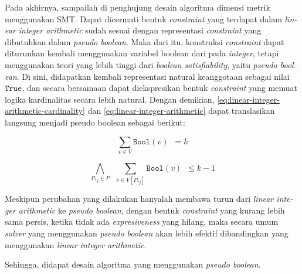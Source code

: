 \documentclass[10pt,twocolumn]{article}
\newcommand{\foreign}[1]{\foreignlanguage{english}{\textit{#1}}}
\def\True{\mathtt{True}}
\def\boolmap{\mathtt{Bool}}
\begin{document}
Pada akhirnya, sampailah di penghujung desain algoritma dimensi metrik menggunakan SMT. Dapat dicermati bentuk \foreign{constraint} yang terdapat dalam \foreign{linear integer arithmetic} sudah sesuai dengan representasi \foreign{constraint} yang dibutuhkan dalam \foreign{pseudo boolean}. Maka dari itu, konstruksi \foreign{constraint} dapat diturunkan kembali menggunakan variabel boolean dari pada \foreign{integer}, tetapi menggunakan teori yang lebih tinggi dari \foreign{boolean satisfiability}, yaitu \foreign{pseudo boolean}. Di sini, didapatkan kembali representasi natural keanggotaan sebagai nilai \(\True\), dan secara bersamaan dapat diekspresikan bentuk \foreign{constraint} yang memuat logika kardinalitas secara lebih natural. Dengan demikian, \autoref{eq:linear-integer-arithmetic-cardinality} dan \autoref{eq:linear-integer-arithmetic} dapat translasikan langsung menjadi pseudo boolean sebagai berikut:

\begin{equation}
	\sum \limits_{\displaystyle v \in V} \boolmap(v) \enspace = k
	\label{eq:pseudo-boolean-cardinality}
\end{equation}

\begin{equation}
	\bigwedge \limits_{\displaystyle P_{*j} \in P} \enspace \sum \limits_{\displaystyle v \in V[P_{*j}]} \boolmap(v) \enspace \leq k - 1
	\label{eq:pseudo-boolean}
\end{equation}

Meskipun perubahan yang dilakukan hanyalah membawa turun dari \foreign{linear integer arithmetic} ke \foreign{pseudo boolean}, dengan bentuk \foreign{constraint} yang kurang lebih sama persis, ketika tidak ada \foreign{expresiveness} yang hilang, maka secara umum \foreign{solver} yang menggunakan \foreign{pseudo boolean} akan lebih efektif dibandingkan yang menggunakan \foreign{linear integer arithmetic}.

Sehingga, didapat desain algoritma yang menggunakan \foreign{pseudo boolean}.
\end{document}
